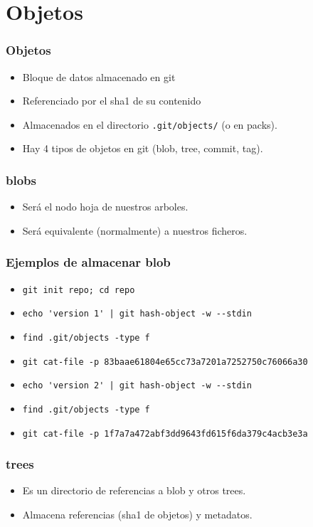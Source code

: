 \documentclass[10pt]{beamer}
\begin{document}
  \section*{Objetos}

  \begin{frame}[containsverbatim]
    \frametitle{Objetos}
    \begin{itemize}
        \item Bloque de datos almacenado en git
        \item Referenciado por el sha1 de su contenido
        \item Almacenados en el directorio \verb$.git/objects/$ (o en packs).
        \item Hay 4 tipos de objetos en git (blob, tree, commit, tag).
    \end{itemize}
  \end{frame}

  \begin{frame}[containsverbatim]
    \frametitle{blobs}
    \begin{itemize}
        \item Será el nodo hoja de nuestros arboles.
        \item Será equivalente (normalmente) a nuestros ficheros.
    \end{itemize}
  \end{frame}

  \begin{frame}[containsverbatim]
    \frametitle{Ejemplos de almacenar blob}
    \begin{itemize}
        \item \verb$git init repo; cd repo$
        \item \verb$echo 'version 1' | git hash-object -w --stdin$
        \item \verb$find .git/objects -type f$
        \item \verb$git cat-file -p 83baae61804e65cc73a7201a7252750c76066a30$
        \item \verb$echo 'version 2' | git hash-object -w --stdin$
        \item \verb$find .git/objects -type f$
        \item \verb$git cat-file -p 1f7a7a472abf3dd9643fd615f6da379c4acb3e3a$
    \end{itemize}
  \end{frame}

  \begin{frame}[containsverbatim]
    \frametitle{trees}
    \begin{itemize}
        \item Es un directorio de referencias a blob y otros trees.
        \item Almacena referencias (sha1 de objetos) y metadatos.
    \end{itemize}
  \end{frame}
\end{document}
